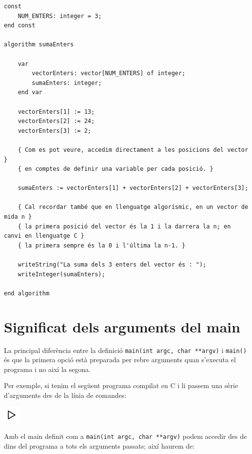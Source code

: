 \documentclass[
]{book}
\newenvironment{Shaded}{\begin{snugshade}}{\end{snugshade}}
\newcommand{\NormalTok}[1]{#1}
\begin{document}
\begin{verbatim}
const
    NUM_ENTERS: integer = 3;
end const

algorithm sumaEnters

    var
        vectorEnters: vector[NUM_ENTERS] of integer;
        sumaEnters: integer;
    end var

    vectorEnters[1] := 13;
    vectorEnters[2] := 24;
    vectorEnters[3] := 2;

    { Com es pot veure, accedim directament a les posicions del vector }
    { en comptes de definir una variable per cada posició. }

    sumaEnters := vectorEnters[1] + vectorEnters[2] + vectorEnters[3];

    { Cal recordar també que en llenguatge algorísmic, en un vector de mida n }
    { la primera posició del vector és la 1 i la darrera la n; en canvi en llenguatge C }
    { la primera sempre és la 0 i l'última la n-1. }

    writeString("La suma dels 3 enters del vector és : ");
    writeInteger(sumaEnters);

end algorithm
\end{verbatim}

\hypertarget{significat-dels-arguments-del-main}{%
\section{Significat dels arguments del main}\label{significat-dels-arguments-del-main}}

La principal diferència entre la definició \texttt{main(int\ argc,\ char\ **argv)} i \texttt{main()} és que la primera opció està preparada per rebre arguments quan s'executa el programa i no així la segona.

Per exemple, si tenim el següent programa compilat en C i li passem una sèrie d'arguments des de la línia de comandes:

\includegraphics{./img/play.png}

\begin{Shaded}
\end{Shaded}

Amb el main definit com a \texttt{main(int\ argc,\ char\ **argv)} podem accedir des de dins del programa a tots els arguments passats; així haurem de:
\end{document}
